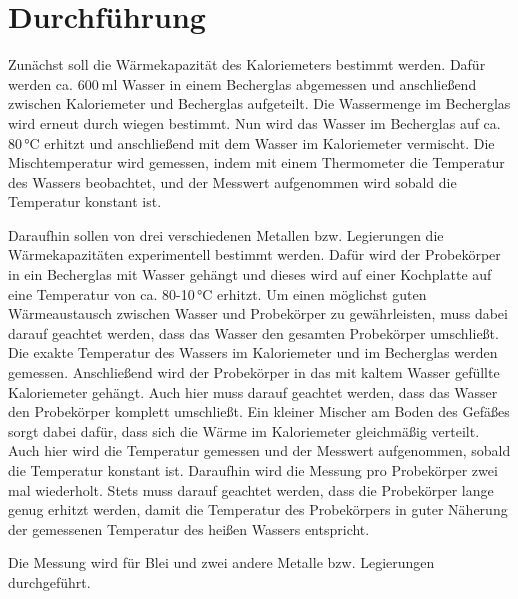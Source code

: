 \section{Durchführung}
\label{sec:Durchführung}

Zunächst soll die Wärmekapazität des Kaloriemeters bestimmt werden. Dafür werden ca.
$\SI{600}{\milli\litre}$ Wasser in einem Becherglas abgemessen und anschließend zwischen Kaloriemeter
und Becherglas aufgeteilt. Die Wassermenge im Becherglas wird erneut durch wiegen
bestimmt. Nun wird das Wasser im Becherglas auf ca. 80\,°C erhitzt und anschließend
mit dem Wasser im Kaloriemeter vermischt. Die Mischtemperatur wird gemessen, indem
mit einem Thermometer die Temperatur des Wassers beobachtet, und der Messwert aufgenommen
wird sobald die Temperatur konstant ist.

Daraufhin sollen von drei verschiedenen Metallen bzw. Legierungen die Wärmekapazitäten
experimentell bestimmt werden. Dafür wird der Probekörper in ein Becherglas mit
Wasser gehängt und dieses wird auf einer Kochplatte auf eine Temperatur von ca. 80-10\,°C erhitzt.
Um einen möglichst guten Wärmeaustausch zwischen Wasser und Probekörper zu gewährleisten, muss dabei
darauf geachtet werden, dass das Wasser den gesamten Probekörper umschließt. Die
exakte Temperatur des Wassers im Kaloriemeter und im Becherglas werden gemessen.
Anschließend wird der Probekörper in das mit kaltem Wasser gefüllte Kaloriemeter gehängt. Auch
hier muss darauf geachtet werden, dass das Wasser den Probekörper komplett umschließt. Ein
kleiner Mischer am Boden des Gefäßes sorgt dabei dafür, dass sich die Wärme im Kaloriemeter
gleichmäßig verteilt. Auch hier wird die Temperatur gemessen und der Messwert aufgenommen,
sobald die Temperatur konstant ist. Daraufhin wird die Messung pro Probekörper zwei mal
wiederholt. Stets muss darauf geachtet werden, dass die Probekörper lange genug erhitzt
werden, damit die Temperatur des Probekörpers in guter Näherung der gemessenen Temperatur
des heißen Wassers entspricht.

Die Messung wird für Blei und zwei andere Metalle bzw. Legierungen durchgeführt.
